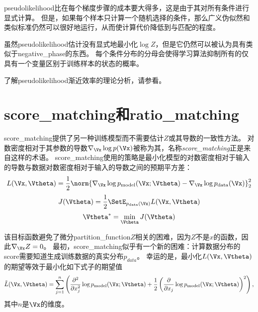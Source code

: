 
\gls{pseudolikelihood}比在每个梯度步骤的成本要大得多，这是由于其对所有条件进行显式计算。
但是，如果每个样本只计算一个随机选择的条件，那么广义伪似然和类似标准仍然可以很好地运行，从而使计算代价降低到与匹配的程度\citep{Goodfellow-et-al-NIPS2013}。


虽然\gls{pseudolikelihood}估计没有显式地最小化$\log Z$，但是它仍然可以被认为具有类似于\gls{negative_phase}的东西。
每个条件分布的分母会使得学习算法抑制所有的仅具有一个变量区别于训练样本的状态的概率。


了解\gls{pseudolikelihood}渐近效率的理论分析，请参看\cite{Marlin11-small}。


\section{\gls{score_matching}和\gls{ratio_matching}}
\label{sec:score_matching_and_ratio_matching}
\gls{score_matching}\citep{Hyvarinen-2005-small}提供了另一种训练模型而不需要估计$Z$或其导数的一致性方法。
对数密度相对于其参数的导数$\nabla_{\Vx} \log p(\Vx)$被称为其，名称\emph{\gls{score_matching}}正是来自这样的术语。
\gls{score_matching}使用的策略是最小化模型的对数密度相对于输入的导数与数据对数密度相对于输入的导数之间的预期平方差：
\begin{equation}
	L(\Vx, \Vtheta) = \frac{1}{2} \norm{  \nabla_{\Vx} \log p_{\text{model}}(\Vx; \Vtheta) - \nabla_{\Vx} \log p_{\text{data}} (\Vx)  }_2^2
\end{equation}
\begin{equation}
	J(\Vtheta) = \frac{1}{2} \SetE_{p_{\text{data}}(\Vx)}  L(\Vx, \Vtheta)
\end{equation}
\begin{equation}
	\Vtheta^* = \min_{\Vtheta} J(\Vtheta)
\end{equation}


该目标函数避免了微分\gls{partition_function}$Z$相关的困难，因为$Z$不是$x$的函数，因此$\nabla_{\Vx} Z = 0$。
最初，\gls{score_matching}似乎有一个新的困难：计算数据分布的\gls{score}需要知道生成训练数据的真实分布$p_{data}$。
幸运的是，最小化$L(\Vx, \Vtheta)$的期望等效于最小化如下式子的期望值
\begin{equation}
	\tilde{L} (\Vx, \Vtheta) = \sum_{j=1}^n \left( \frac{\partial^2}{ \partial x_j^2 } 
	\log p_{\text{model}} (\Vx; \Vtheta) + \frac{1}{2} \left( \frac{\partial}{ \partial x_j }
	\log p_{\text{model}} (\Vx; \Vtheta)
  \right)^2
\right),
\end{equation}
其中$n$是$\Vx$的维度。

